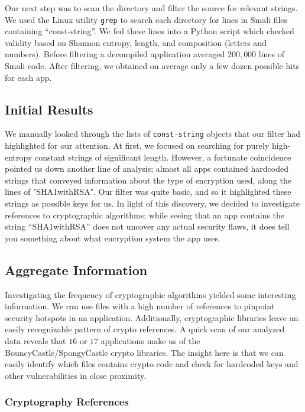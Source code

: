 \documentclass[11pt]{article}
\numberwithin{theorem}{subsection}
\begin{document}
Our next step was to scan the directory and filter the source for relevant strings. We used the Linux utility \texttt{grep} 
to search each directory for lines in Smali files containing ``const-string''. We fed these lines into a Python script
which checked validity based on Shannon entropy, length, and composition (letters and numbers). Before filtering a
decompiled application averaged $200,000$ lines of Smali code. After filtering, we obtained on average only a few dozen
possible hits for each app.

\subsection{Initial Results}

  We manually looked through the lists of \texttt{const-string} objects that our filter had highlighted for our attention.
At first, we focused on searching for purely high-entropy constant strings of significant length. However, a fortunate coincidence 
pointed us down another line of analysis; almost all apps contained hardcoded strings that conveyed information about the type 
of encryption used, along the lines of "SHA1withRSA".  Our filter was quite basic, and so it highlighted these strings as possible 
keys for us.  In light of this discovery, we decided to investigate references to cryptographic algorithms; while seeing that an 
app contains the string ``SHA1withRSA'' does not uncover any actual security flaws, it does tell you something about what encryption 
system the app uses.

\subsection{Aggregate Information}

  Investigating the frequency of cryptographic algorithms yielded some interesting information. We can use
files with a high number of references to pinpoint security hotspots in an application. Additionally, 
cryptographic libraries leave an easily recognizable pattern of crypto references. A quick scan
of our analyzed data reveals that $16$ or $17$ applications make us of the BouncyCastle/SpongyCastle crypto
libraries. The insight here is that we can easily identify which files contains crypto code and check
for hardcoded keys and other vulnerabilities in close proximity.

\subsubsection{Cryptography References}
\end{document}
